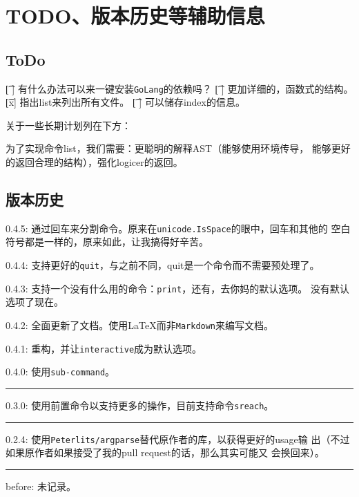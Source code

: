 \documentclass{peterlitsdoc}
\def\hline{\begingroup
    \noindent\pltgray\rule{\textwidth}{0.5pt}%
    \endgroup}
\begin{document}

\section{TODO、版本历史等辅助信息}

\subsection{ToDo}
\begin{plttodoenv}{1}
    \t[ ] 有什么办法可以来一键安装\verb|GoLang|的依赖吗？
    \t[ ] 更加详细的，函数式的结构。
    \t[x] 指出list来列出所有文件。
    \t[ ] 可以储存index的信息。
\end{plttodoenv}
\bigskip

关于一些长期计划列在下方：

为了实现命令list，我们需要：更聪明的解释AST（能够使用环境传导，
能够更好的返回合理的结构），强化logicer的返回。

\subsection{版本历史}

0.4.5: 通过回车来分割命令。原来在\verb|unicode.IsSpace|的眼中，回车和其他的
空白符号都是一样的，原来如此，让我搞得好辛苦。

0.4.4: 支持更好的\verb|quit|，与之前不同，quit是一个命令而不需要预处理了。

0.4.3: 支持一个没有什么用的命令：\verb|print|，还有，去你妈的默认选项。
没有默认选项了现在。

0.4.2: 全面更新了文档。使用\LaTeX{}而非\verb|Markdown|来编写文档。

0.4.1: 重构，并让\verb|interactive|成为默认选项。

0.4.0: 使用\verb|sub-command|。

\hline

0.3.0: 使用前置命令以支持更多的操作，目前支持命令\verb|sreach|。

\hline

0.2.4: 使用\verb|Peterlits/argparse|替代原作者的库，以获得更好的usage输
出（不过如果原作者如果接受了我的pull request的话，那么其实可能又
会换回来）。

\hline

before: 未记录。
\end{document}
